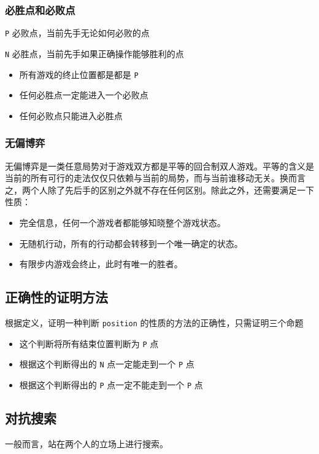 \documentclass[UTF-8]{ctexart}
\begin{document}
	\subsubsection{必胜点和必败点}
	
	\texttt{P} 必败点，当前先手无论如何必败的点  
	
	\texttt{N} 必胜点，当前先手如果正确操作能够胜利的点
	
	\begin{itemize}
		\item 所有游戏的终止位置都是都是 \texttt{P}   
		\item 任何必胜点一定能进入一个必败点  
		\item 任何必败点只能进入必胜点
	\end{itemize}
	
	\subsubsection{无偏博弈}
	
	无偏博弈是一类任意局势对于游戏双方都是平等的回合制双人游戏。平等的含义是当前的所有可行的走法仅仅只依赖与当前的局势，而与当前谁移动无关。换而言之，两个人除了先后手的区别之外就不存在任何区别。除此之外，还需要满足一下性质：  
	
	\begin{itemize}
		\item 完全信息，任何一个游戏者都能够知晓整个游戏状态。  
		\item 无随机行动，所有的行动都会转移到一个唯一确定的状态。  
		\item 有限步内游戏会终止，此时有唯一的胜者。
	\end{itemize}
	
	\subsection{正确性的证明方法}
	
	根据定义，证明一种判断 \texttt{position} 的性质的方法的正确性，只需证明三个命题
	
	\begin{itemize}
		\item 这个判断将所有结束位置判断为 \texttt{P} 点
		\item 根据这个判断得出的 \texttt{N} 点一定能走到一个 \texttt{P} 点
		\item 根据这个判断得出的 \texttt{P} 点一定不能走到一个 \texttt{P} 点
	\end{itemize}
	\subsection{对抗搜索}
	一般而言，站在两个人的立场上进行搜索。
	
\end{document}
